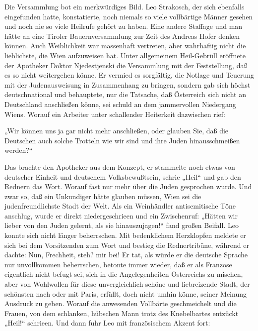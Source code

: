 Die Versammlung bot ein merkwürdiges Bild. Leo
Strakosch, der sich ebenfalls eingefunden hatte, konstatierte, noch
niemals so viele vollbärtige Männer gesehen und noch nie so viele
Heilrufe gehört zu haben. Eine andere Staffage und man hätte an
eine Tiroler Bauernversammlung zur Zeit des Andreas Hofer denken
können. Auch Weiblichkeit war massenhaft vertreten, aber wahrhaftig
nicht die lieblichste, die Wien aufzuweisen hat. Unter allgemeinem
Heil-Gebrüll eröffnete der Apotheker Doktor Njedestjenski die
Versammlung mit der Feststellung, daß es so nicht weitergehen
könne. Er vermied es sorgfältig, die Notlage und Teuerung mit der
Judenausweisung in Zusammenhang zu bringen, sondern gab sich höchst
deutschnational und behauptete, nur die Tatsache, daß Österreich
sich nicht an Deutschland anschließen könne, sei schuld an dem
jammervollen Niedergang Wiens. Worauf ein Arbeiter unter
schallender Heiterkeit dazwischen rief:

„Wir können uns ja gar nicht mehr anschließen, oder glauben Sie,
daß die Deutschen auch solche Trotteln wie wir sind und ihre Juden
hinausschmeißen werden?“

Das brachte den Apotheker aus dem Konzept, er stammelte noch etwas
von deutscher Einheit und deutschem Volksbewußtsein, schrie „Heil“
und gab den Rednern das Wort. Worauf fast nur mehr über die Juden
gesprochen wurde. Und zwar so, daß ein Unkundiger hätte glauben
müssen, Wien sei die judenfreundlichste Stadt der Welt. Als ein
Weinhändler antisemitische Töne anschlug, wurde er direkt
niedergeschrieen und ein Zwischenruf: „Hätten wir lieber von den
Juden gelernt, als sie hinauszujagen!“  fand großen
Beifall. Leo konnte sich nicht länger beherrschen. Mit bedenklichem
Herzklopfen meldete er sich bei dem Vorsitzenden zum Wort und
bestieg die Rednertribüne, während er dachte: Nun, Frechheit, steh?
mir bei! Er tat, als würde er die deutsche Sprache nur unvollkommen
beherrschen, betonte immer wieder, daß er als Franzose eigentlich
nicht befugt sei, sich in die Angelegenheiten Österreichs zu
mischen, aber von Wohlwollen für diese unvergleichlich schöne und
liebreizende Stadt, der schönsten nach oder mit Paris, erfüllt,
doch nicht umhin könne, seiner Meinung Ausdruck zu geben. Worauf
die anwesenden Vollbärte geschmeichelt und die Frauen, von dem
schlanken, hübschen Mann trotz des Knebelbartes entzückt „Heil!“
schrieen. Und dann fuhr Leo mit französischem Akzent fort:

